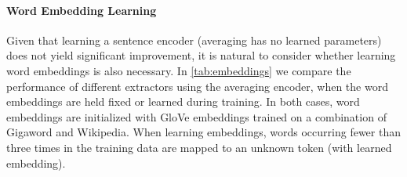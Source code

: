 




 
\paragraph{Word Embedding Learning}
 Given that learning a sentence encoder (averaging has no learned parameters)
 does not yield significant improvement, it is natural to consider whether
 learning word embeddings is also necessary. 
 In \autoref{tab:embeddings} we compare the performance of different extractors
 using the averaging encoder, when the word embeddings are held fixed or 
 learned during training. In both cases, word embeddings are initialized with
 GloVe embeddings trained on a combination of Gigaword and Wikipedia.
 When learning embeddings, words occurring 
 fewer than three times in the training data are mapped to an unknown
 token (with learned embedding).
 
